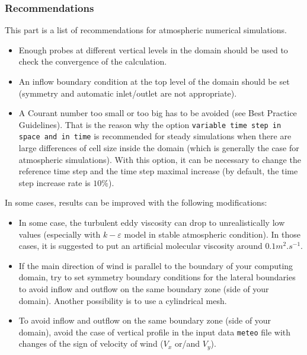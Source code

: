 \subsubsection{Recommendations}\label{subsubsec:recommendations}
%
This part is a list of recommendations for atmospheric numerical simulations.
%
\begin{itemize}
\item Enough probes at different vertical levels in the domain should be used
to check the convergence of the calculation.
\item An inflow boundary condition at the top level of the domain should be set
(symmetry and automatic inlet/outlet are not appropriate).
\item A Courant number too small or too big has to be avoided (see \CS Best
Practice Guidelines). That is the reason why the option \texttt{variable time
step in space and in time} is recommended for steady simulations when there are
large differences of cell size inside the domain (which is generally the case
for atmospheric simulations). With this option, it can be necessary to change
the reference time step and the time step maximal increase (by default, the time
step increase rate is $10\%$).
\end{itemize}
%
In some cases, results can be improved with the following modifications:
%
\begin{itemize}
\item In some case, the turbulent eddy viscosity can drop to unrealistically low
values (especially with $k-\varepsilon$ model in stable atmospheric condition).
In those cases, it is suggested to put an artificial molecular viscosity around
$0.1 m^{2}.s^{-1}$.
\item If the main direction of wind is parallel to the boundary of your computing
domain, try to set symmetry boundary conditions for the lateral boundaries to
avoid inflow and outflow on the same boundary zone (side of your domain).
Another possibility is to use a cylindrical mesh.
\item To avoid inflow and outflow on the same boundary zone (side of your domain),
avoid the case of vertical profile in the input data \texttt{meteo} file with
changes of the sign of velocity of wind ($V_x$ or/and $V_y$).
\end{itemize}


